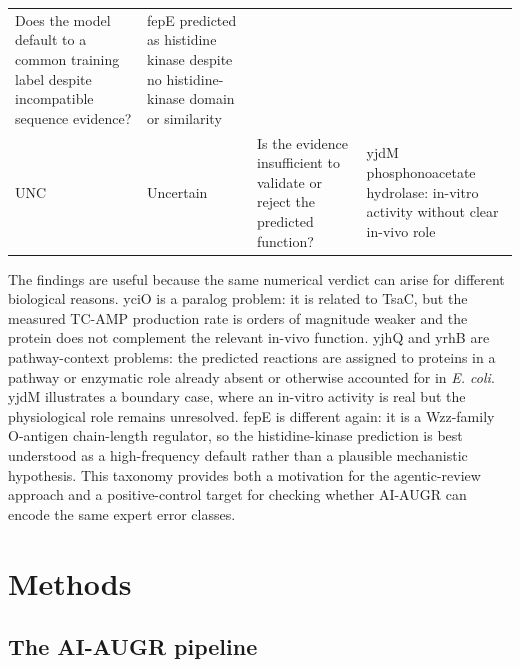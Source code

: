 \documentclass[
  11pt,
]{article}
\begin{document}
\begin{longtable}[]{@{}llll@{}}
\begin{minipage}[t]{0.22\columnwidth}
Does the model default to a common training label despite incompatible
sequence evidence?\strut
\end{minipage} & \begin{minipage}[t]{0.22\columnwidth}\raggedright
fepE predicted as histidine kinase despite no histidine-kinase domain or
similarity\strut
\end{minipage}\tabularnewline
\begin{minipage}[t]{0.22\columnwidth}\raggedright
UNC\strut
\end{minipage} & \begin{minipage}[t]{0.22\columnwidth}\raggedright
Uncertain\strut
\end{minipage} & \begin{minipage}[t]{0.22\columnwidth}\raggedright
Is the evidence insufficient to validate or reject the predicted
function?\strut
\end{minipage} & \begin{minipage}[t]{0.22\columnwidth}\raggedright
yjdM phosphonoacetate hydrolase: in-vitro activity without clear in-vivo
role\strut
\end{minipage}\tabularnewline
\bottomrule
\end{longtable}

The findings are useful because the same numerical verdict can arise for
different biological reasons. yciO is a paralog problem: it is related
to TsaC, but the measured TC-AMP production rate is orders of magnitude
weaker and the protein does not complement the relevant in-vivo
function. yjhQ and yrhB are pathway-context problems: the predicted
reactions are assigned to proteins in a pathway or enzymatic role
already absent or otherwise accounted for in \emph{E. coli}. yjdM
illustrates a boundary case, where an in-vitro activity is real but the
physiological role remains unresolved. fepE is different again: it is a
Wzz-family O-antigen chain-length regulator, so the histidine-kinase
prediction is best understood as a high-frequency default rather than a
plausible mechanistic hypothesis. This taxonomy provides both a
motivation for the agentic-review approach and a positive-control target
for checking whether AI-AUGR can encode the same expert error classes.

\hypertarget{methods}{%
\section{Methods}\label{methods}}

\hypertarget{the-ai-augr-pipeline}{%
\subsection{The AI-AUGR pipeline}\label{the-ai-augr-pipeline}}
\end{document}
